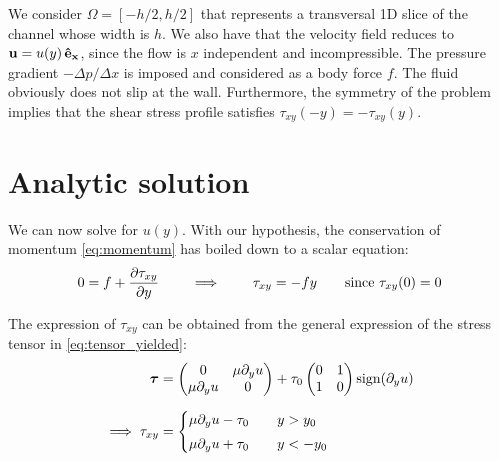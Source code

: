 \documentclass[11 pt]{report}
\begin{document}
We consider $\Omega = [-h/2, h/2]$ that represents a transversal 1D slice of the channel whose width is $h$. We also have that the velocity field reduces to $\mathbf{u} = u(y)\,\mathbf{\hat{e}_x}$, since the flow is $x$ independent and incompressible. The pressure gradient $-\Delta p/\Delta x$ is imposed and considered as a body force $f$. The fluid obviously does not slip at the wall. Furthermore, the symmetry of the problem implies that the shear stress profile satisfies $\tau_{xy}(-y) = -\tau_{xy}(y)$.


\section{Analytic solution}
We can now solve for $u(y)$. With our hypothesis, the conservation of momentum \eqref{eq:momentum} has boiled down to a scalar equation:
\begin{align}
    0 = f + \pdv{\tau_{xy}}{y} \qquad \implies \qquad \tau_{xy} = -f y \qquad \text{since } \tau_{xy}(0)=0
    \label{eq:tau_xy}
\end{align}

The expression of $\tau_{xy}$ can be obtained from the general expression of the stress tensor in \eqref{eq:tensor_yielded}:
\begin{align}
    \boldsymbol{\tau} &=
    \begin{pmatrix}
        0 & \mu \partial_y u\\
        \mu \partial_y u & 0\\
    \end{pmatrix} + \tau_0
    \begin{pmatrix}
        0 & 1\\
        1 & 0\\
    \end{pmatrix} \sign(\partial_y u) \\[6pt] %
    \implies \tau_{xy} &=
    \begin{cases}
        \mu \partial_y u - \tau_0  \qquad y > y_0\\[3pt]
        \mu \partial_y u + \tau_0  \qquad y < -y_0\\
    \end{cases} \label{eq:tau_xy_cases}
\end{align}
\end{document}
